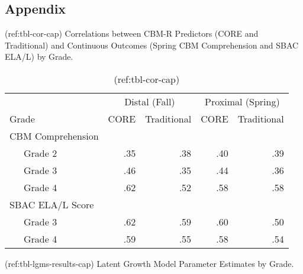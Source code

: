 \clearpage
\makeatletter
\efloat@restorefloats
\makeatother


\begin{appendix}
\hypertarget{appendix}{%
\section{Appendix}\label{appendix}}

(ref:tbl-cor-cap) Correlations between CBM-R Predictors (CORE and
Traditional) and Continuous Outcomes (Spring CBM Comprehension and SBAC
ELA/L) by Grade.

\begin{table}[tbp]

\begin{center}
\begin{threeparttable}

\caption{\label{tab:tbl-cor}(ref:tbl-cor-cap)}

\begin{tabular}{lrrrr}
\toprule
 & \multicolumn{2}{c}{Distal (Fall)} & \multicolumn{2}{c}{Proximal (Spring)} \\
\cmidrule(r){2-3} \cmidrule(r){4-5}
Grade & \multicolumn{1}{c}{CORE} & \multicolumn{1}{c}{Traditional} & \multicolumn{1}{c}{CORE} & \multicolumn{1}{c}{Traditional}\\
\midrule
CBM Comprehension &  &  &  & \\
\ \ \ Grade 2 & .35 & .38 & .40 & .39\\
\ \ \ Grade 3 & .46 & .35 & .44 & .36\\
\ \ \ Grade 4 & .62 & .52 & .58 & .58\\
SBAC ELA/L Score &  &  &  & \\
\ \ \ Grade 3 & .62 & .59 & .60 & .50\\
\ \ \ Grade 4 & .59 & .55 & .58 & .54\\
\bottomrule
\end{tabular}

\end{threeparttable}
\end{center}

\end{table}

(ref:tbl-lgms-results-cap) Latent Growth Model Parameter Estimates by
Grade.

\begin{center}
\begin{ThreePartTable}


\end{ThreePartTable}
\end{center}
\end{appendix}

